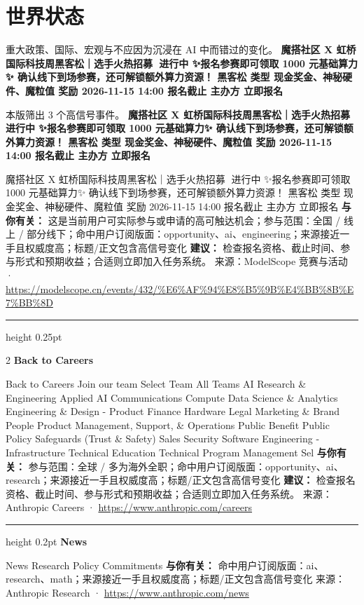 \documentclass[10.5pt]{ctexart}
\begin{document}
\section*{世界状态}
{\color{ormuted} 重大政策、国际、宏观与不应因为沉浸在 AI 中而错过的变化。}
\vspace{2mm}
{\LARGE\bfseries 魔搭社区 X 虹桥国际科技周黑客松｜选手火热招募🚀 进行中 ✨报名参赛即可领取 1000 元基础算力✨ 确认线下到场参赛，还可解锁额外算力资源！ 黑客松 类型 现金奖金、神秘硬件、魔粒值 奖励 2026-11-15 14:00 报名截止 主办方 立即报名}\par
\vspace{1mm}
{\color{ormuted} 本版筛出 3 个高信号事件。}
\vspace{3mm}
{\Large\bfseries 魔搭社区 X 虹桥国际科技周黑客松｜选手火热招募🚀 进行中 ✨报名参赛即可领取 1000 元基础算力✨ 确认线下到场参赛，还可解锁额外算力资源！ 黑客松 类型 现金奖金、神秘硬件、魔粒值 奖励 2026-11-15 14:00 报名截止 主办方 立即报名}\par
魔搭社区 X 虹桥国际科技周黑客松｜选手火热招募🚀 进行中 ✨报名参赛即可领取 1000 元基础算力✨ 确认线下到场参赛，还可解锁额外算力资源！ 黑客松 类型 现金奖金、神秘硬件、魔粒值 奖励 2026-11-15 14:00 报名截止 主办方 立即报名
\textbf{与你有关：} 这是当前用户可实际参与或申请的高可触达机会；参与范围：全国 / 线上 / 部分线下；命中用户订阅版面：opportunity、ai、engineering；来源接近一手且权威度高；标题/正文包含高信号变化
\textbf{建议：} 检查报名资格、截止时间、参与形式和预期收益；合适则立即加入任务系统。
{\footnotesize\color{ormuted} 来源：ModelScope 竞赛与活动 · \url{https://modelscope.cn/events/432/%E6%AF%94%E8%B5%9B%E4%BB%8B%E7%BB%8D}}
\vspace{4mm}
\hrule height 0.25pt
\vspace{3mm}
\begin{multicols}{2}
{\large\bfseries Back to Careers}\par
Back to Careers Join our team Select Team All Teams AI Research \& Engineering Applied AI Communications Compute Data Science \& Analytics Engineering \& Design - Product Finance Hardware Legal Marketing \& Brand People Product Management, Support, \& Operations Public Benefit Public Policy Safeguards (Trust \& Safety) Sales Security Software Engineering - Infrastructure Technical Education Technical Program Management Sel
\textbf{与你有关：} 参与范围：全球 / 多为海外全职；命中用户订阅版面：opportunity、ai、research；来源接近一手且权威度高；标题/正文包含高信号变化
\textbf{建议：} 检查报名资格、截止时间、参与形式和预期收益；合适则立即加入任务系统。
{\footnotesize\color{ormuted} 来源：Anthropic Careers · \url{https://www.anthropic.com/careers}}
\vspace{2mm}
\hrule height 0.2pt
\vspace{2mm}
{\large\bfseries News}\par
News Research Policy Commitments
\textbf{与你有关：} 命中用户订阅版面：ai、research、math；来源接近一手且权威度高；标题/正文包含高信号变化
{\footnotesize\color{ormuted} 来源：Anthropic Research · \url{https://www.anthropic.com/news}}
\end{multicols}
\end{document}

